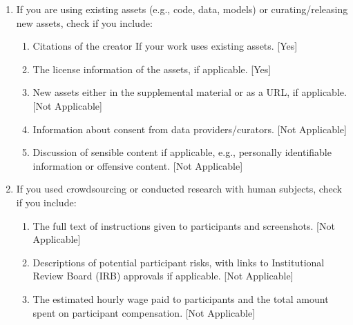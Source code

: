 \begin{enumerate}
 \item If you are using existing assets (e.g., code, data, models) or curating/releasing new assets, check if you include:
 \begin{enumerate}
   \item Citations of the creator If your work uses existing assets. [Yes]
   \item The license information of the assets, if applicable. [Yes]
   \item New assets either in the supplemental material or as a URL, if applicable. [Not Applicable]
   \item Information about consent from data providers/curators. [Not Applicable]
   \item Discussion of sensible content if applicable, e.g., personally identifiable information or offensive content. [Not Applicable]
 \end{enumerate}

 \item If you used crowdsourcing or conducted research with human subjects, check if you include:
 \begin{enumerate}
   \item The full text of instructions given to participants and screenshots. [Not Applicable]
   \item Descriptions of potential participant risks, with links to Institutional Review Board (IRB) approvals if applicable. [Not Applicable]
   \item The estimated hourly wage paid to participants and the total amount spent on participant compensation. [Not Applicable]
 \end{enumerate}

 \end{enumerate}
